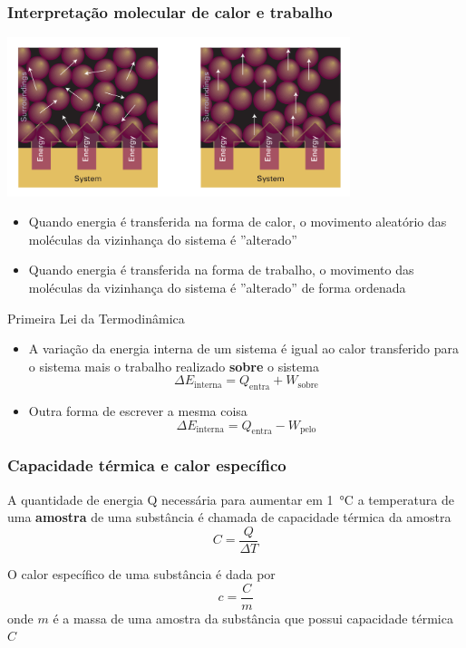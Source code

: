 \documentclass[t,%
brazilian,%
11pt,%
aspectratio=169,%
table%
]{beamer}
\begin{document}
\begin{frame}
    \frametitle{Interpretação molecular de calor e trabalho}
    \begin{center}
        \includegraphics[width=0.75\textwidth]{images/trabalho_calor.png}
    \end{center}

    \begin{itemize}

        \item Quando energia é transferida na forma de calor, o movimento
            aleatório das moléculas da vizinhança do sistema é ''alterado''
        \item Quando energia é transferida na forma de trabalho, o movimento
            das moléculas da vizinhança do sistema é ''alterado'' de forma
            ordenada

    \end{itemize}
\end{frame}

\begin{frame}[c]
    \begin{block}{Primeira Lei da Termodinâmica}
        \begin{itemize}
            \item A variação da energia interna de um sistema é igual ao calor
                transferido para o sistema mais o trabalho realizado
                \textbf{sobre} o sistema
                \[
                    \Delta E_{\text{interna}} = Q_{\text{entra}} + W_{\text{sobre}}
                \]
            \item Outra forma de escrever a mesma coisa
                \[
                    \Delta E_{\text{interna}} = Q_{\text{entra}} - W_{\text{pelo}}
                \]
        \end{itemize}
    \end{block}
\end{frame}

\begin{frame}
    \frametitle{Capacidade térmica e calor específico}
    A quantidade de energia Q necessária para aumentar em \SI{1}{\celsius} a
    temperatura de uma \textbf{amostra} de uma substância é chamada de
    capacidade térmica da amostra
    \[
        C=\frac{Q}{\Delta T}
    \]

    O calor específico de uma substância é dada por
    \[
        c=\frac{C}{m}
    \]
    onde $m$ é a massa de uma amostra da substância que possui capacidade térmica $C$
\end{frame}
\end{document}
